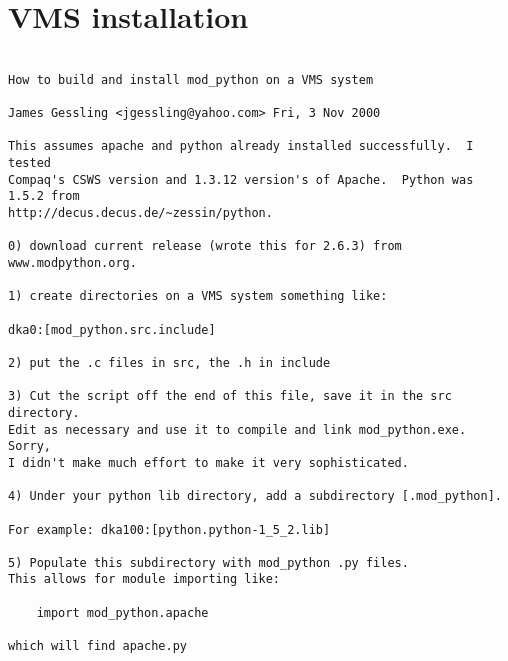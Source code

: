\chapter{VMS installation\label{app-vnsinst}}


\begin{verbatim}

How to build and install mod_python on a VMS system

James Gessling <jgessling@yahoo.com> Fri, 3 Nov 2000 

This assumes apache and python already installed successfully.  I tested
Compaq's CSWS version and 1.3.12 version's of Apache.  Python was 1.5.2 from
http://decus.decus.de/~zessin/python.

0) download current release (wrote this for 2.6.3) from www.modpython.org.

1) create directories on a VMS system something like:

dka0:[mod_python.src.include]

2) put the .c files in src, the .h in include

3) Cut the script off the end of this file, save it in the src directory.  
Edit as necessary and use it to compile and link mod_python.exe.  Sorry,
I didn't make much effort to make it very sophisticated.

4) Under your python lib directory, add a subdirectory [.mod_python].

For example: dka100:[python.python-1_5_2.lib]

5) Populate this subdirectory with mod_python .py files.
This allows for module importing like:

    import mod_python.apache

which will find apache.py
\end{verbatim}
